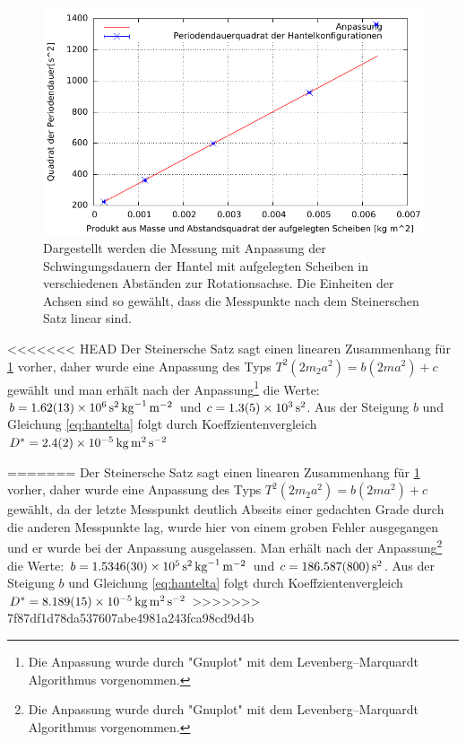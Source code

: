\begin{figure}[h]
	\centering
	\includegraphics[width=0.7\linewidth]{auswertung/hantel/HantelF}
	\caption{Dargestellt werden die Messung mit Anpassung der Schwingungsdauern der Hantel mit aufgelegten Scheiben in verschiedenen Abständen zur Rotationsachse. Die Einheiten der Achsen sind so gewählt, dass die Messpunkte nach dem Steinerschen Satz linear sind.  }
	\label{fig:hantel}
\end{figure}

<<<<<<< HEAD
Der Steinersche Satz sagt einen linearen Zusammenhang für \cref{fig:hantel} vorher, daher wurde eine Anpassung des Typs $T^2(2m_2 a^2)=b (2m a^2)+c$ gewählt und man erhält nach der Anpassung\footnote{Die Anpassung wurde durch "Gnuplot" mit dem Levenberg–Marquardt Algorithmus vorgenommen.  } die Werte: $ b               = \SI{1.62   \pm 0.13 e+006}{\second \squared \per \kilogram \per \metre \squared} $ und $c               = \SI{ 1.3      +-0.5e3 }   {\second \squared}$. Aus der Steigung $b$ und Gleichung \ref{eq:hantelta} folgt durch Koeffzientenvergleich $D^*=\SI{2.4+-0.2e-5}{\kilogram \metre \squared \per \second \squared }$




=======
Der Steinersche Satz sagt einen linearen Zusammenhang für \cref{fig:hantel} vorher, daher wurde eine Anpassung des Typs $T^2(2m_2 a^2)=b (2m a^2)+c$ gewählt, da der letzte Messpunkt deutlich Abseits einer gedachten Grade durch die anderen Messpunkte lag, wurde hier von einem groben Fehler ausgegangen und er wurde bei der Anpassung ausgelassen.
Man erhält nach der Anpassung\footnote{Die Anpassung wurde durch "Gnuplot" mit dem Levenberg–Marquardt Algorithmus vorgenommen.  } die Werte:
 $ b               = \SI{1.5346 \pm 0.003 e+005}{\second \squared \per \kilogram \per \metre \squared} $ und $c               = \SI{186.587\pm 0.8 }   {\second \squared}$. Aus der Steigung $b$ und Gleichung \ref{eq:hantelta} folgt durch Koeffzientenvergleich $D^*=\SI{8.189+-0.015e-5}{\kilogram \metre \squared \per \second \squared }$
>>>>>>> 7f87df1d78da537607abe4981a243fca98cd9d4b


